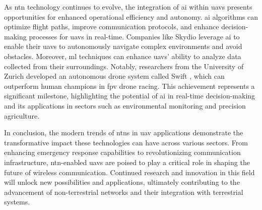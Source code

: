 As \gls{ntn} technology continues to evolve, the integration of \gls{ai} within \glspl{uav} presents opportunities for enhanced operational efficiency and autonomy. \gls{ai} algorithms can optimize flight paths, improve communication protocols, and enhance decision-making processes for \glspl{uav} in real-time. Companies like Skydio \autocite{skydioSkydioAutonomous} leverage \gls{ai} to enable their \glspl{uav} to autonomously navigate complex environments and avoid obstacles. Moreover, \gls{ml} techniques can enhance \glspl{uav}' ability to analyze data collected from their surroundings. Notably, researchers from the University of Zurich developed an autonomous drone system called Swift \autocite{Kaufmann2023ChampionlevelDR}, which can outperform human champions in \gls{fpv} drone racing. This achievement represents a significant milestone, highlighting the potential of \gls{ai} in real-time decision-making and its applications in sectors such as environmental monitoring and precision agriculture.

In conclusion, the modern trends of \glspl{ntn} in \gls{uav} applications demonstrate the transformative impact these technologies can have across various sectors. From enhancing emergency response capabilities to revolutionizing communication infrastructure, \gls{ntn}-enabled \glspl{uav} are poised to play a critical role in shaping the future of wireless communication. Continued research and innovation in this field will unlock new possibilities and applications, ultimately contributing to the advancement of non-terrestrial networks and their integration with terrestrial systems.

